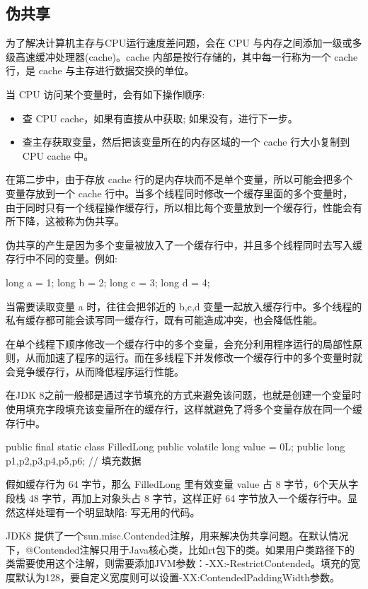 \subsection{伪共享}

为了解决计算机主存与CPU运行速度差问题，会在 CPU 与内存之间添加一级或多级高速缓冲处理器(cache)。cache 内部是按行存储的，其中每一行称为一个 cache 行，是 cache 与主存进行数据交换的单位。

当 CPU 访问某个变量时，会有如下操作顺序:
\begin{itemize}
    \item 查 CPU cache，如果有直接从中获取; 如果没有，进行下一步。
    \item 查主存获取变量，然后把该变量所在的内存区域的一个 cache 行大小复制到 CPU cache 中。
\end{itemize}

在第二步中，由于存放 cache 行的是内存块而不是单个变量，所以可能会把多个变量存放到一个 cache 行中。当多个线程同时修改一个缓存里面的多个变量时，由于同时只有一个线程操作缓存行，所以相比每个变量放到一个缓存行，性能会有所下降，这被称为伪共享。

伪共享的产生是因为多个变量被放入了一个缓存行中，并且多个线程同时去写入缓存行中不同的变量。例如:

\begin{Java}
long a = 1;
long b = 2;
long c = 3;
long d = 4;
\end{Java}

当需要读取变量 a 时，往往会把邻近的 b,c,d 变量一起放入缓存行中。多个线程的私有缓存都可能会读写同一缓存行，既有可能造成冲突，也会降低性能。

在单个线程下顺序修改一个缓存行中的多个变量，会充分利用程序运行的局部性原则，从而加速了程序的运行。而在多线程下并发修改一个缓存行中的多个变量时就会竞争缓存行，从而降低程序运行性能。

在JDK 8之前一般都是通过字节填充的方式来避免该问题，也就是创建一个变量时使用填充字段填充该变量所在的缓存行，这样就避免了将多个变量存放在同一个缓存行中。

\begin{Java}
public final static class FilledLong {
    public volatile long value = 0L;
    public long p1,p2,p3,p4,p5,p6;  // 填充数据
}
\end{Java}

假如缓存行为 64 字节，那么 FilledLong 里有效变量 value 占 8 字节，6个天从字段栈 48 字节，再加上对象头占 8 字节，这样正好 64 字节放入一个缓存行中。显然这样处理有一个明显缺陷: 写无用的代码。

JDK8 提供了一个sun.misc.Contended注解，用来解决伪共享问题。在默认情况下，@Contended注解只用于Java核心类，比如rt包下的类。如果用户类路径下的类需要使用这个注解，则需要添加JVM参数：-XX:-RestrictContended。填充的宽度默认为128，要自定义宽度则可以设置-XX:ContendedPaddingWidth参数。

